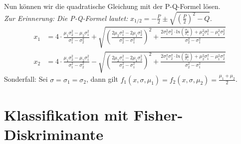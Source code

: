 \documentclass[12pt]{article}
\begin{document}
Nun k\"onnen wir die quadratische Gleichung mit der P-Q-Formel l\"osen.\\
\textit{Zur Erinnerung: Die P-Q-Formel lautet:} $x_{1/2} = -\frac{P}{2} \pm \sqrt{\left(\frac{P}{2}\right)^2 - Q}$.
\begin{align*}
x_1 &= 4 \cdot \frac{\mu_1\sigma_2^2 - \mu_2\sigma_1^2}{\sigma_1^2-\sigma_2^2} + \sqrt{\left( \frac{2\mu_2\sigma_1^2 - 2\mu_1\sigma_2^2}{\sigma_2^2-\sigma_1^2} \right)^2 + \frac{2 \sigma_1^2 \sigma_2^2 \cdot ln \left(\frac{\sigma_2}{\sigma_1}\right) + \mu_2^2\sigma_1^2 - \mu_1^2\sigma_2^2}{\sigma_2^2-\sigma_1^2}}\\
x_2 &= 4 \cdot \frac{\mu_1\sigma_2^2 - \mu_2\sigma_1^2}{\sigma_1^2-\sigma_2^2} - \sqrt{\left( \frac{2\mu_2\sigma_1^2 - 2\mu_1\sigma_2^2}{\sigma_2^2-\sigma_1^2} \right)^2 + \frac{2 \sigma_1^2 \sigma_2^2 \cdot ln \left(\frac{\sigma_2}{\sigma_1}\right) + \mu_2^2\sigma_1^2 - \mu_1^2\sigma_2^2}{\sigma_2^2-\sigma_1^2}}
\end{align*}
Sonderfall: Sei $\sigma = \sigma_1 = \sigma_2$, dann gilt $f_1(x,\sigma,\mu_1) = f_2(x,\sigma,\mu_2) = \frac{\mu_1+\mu_2}{2}$.
\newpage

\section{Klassifikation mit Fisher-Diskriminante}
\begin{lstlisting}[language=Matlab]
\end{lstlisting}
\newpage
\end{document}
